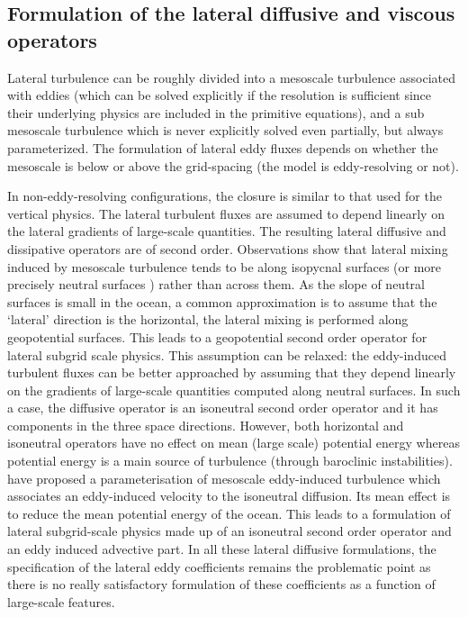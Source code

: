 \documentclass[../main/NEMO_manual]{subfiles}
\begin{document}
\subsection{Formulation of the lateral diffusive and viscous operators}
\label{subsec:PE_ldf}

Lateral turbulence can be roughly divided into a mesoscale turbulence associated with eddies
(which can be solved explicitly if the resolution is sufficient since
their underlying physics are included in the primitive equations),
and a sub mesoscale turbulence which is never explicitly solved even partially, but always parameterized.
The formulation of lateral eddy fluxes depends on whether the mesoscale is below or above the grid-spacing
(\ie the model is eddy-resolving or not).

In non-eddy-resolving configurations, the closure is similar to that used for the vertical physics.
The lateral turbulent fluxes are assumed to depend linearly on the lateral gradients of large-scale quantities.
The resulting lateral diffusive and dissipative operators are of second order.
Observations show that lateral mixing induced by mesoscale turbulence tends to be along isopycnal surfaces
(or more precisely neutral surfaces \cite{McDougall1987}) rather than across them.
As the slope of neutral surfaces is small in the ocean, a common approximation is to assume that
the `lateral' direction is the horizontal, \ie the lateral mixing is performed along geopotential surfaces.
This leads to a geopotential second order operator for lateral subgrid scale physics.
This assumption can be relaxed: the eddy-induced turbulent fluxes can be better approached by assuming that
they depend linearly on the gradients of large-scale quantities computed along neutral surfaces.
In such a case, the diffusive operator is an isoneutral second order operator and
it has components in the three space directions.
However,
both horizontal and isoneutral operators have no effect on mean (\ie large scale) potential energy whereas
potential energy is a main source of turbulence (through baroclinic instabilities).
\citet{Gent1990} have proposed a parameterisation of mesoscale eddy-induced turbulence which
associates an eddy-induced velocity to the isoneutral diffusion.
Its mean effect is to reduce the mean potential energy of the ocean.
This leads to a formulation of lateral subgrid-scale physics made up of an isoneutral second order operator and
an eddy induced advective part.
In all these lateral diffusive formulations,
the specification of the lateral eddy coefficients remains the problematic point as
there is no really satisfactory formulation of these coefficients as a function of large-scale features.
\end{document}
